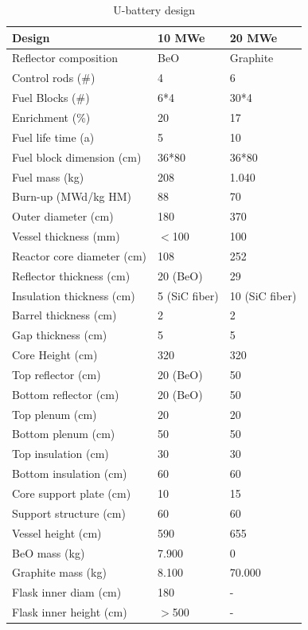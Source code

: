 \documentclass[10pt,a4paper]{article}
\begin{document}
\begin{table} [htbp]
\begin{center}

\caption{U-battery design}
\label{Utable}
\begin{tabular}{l l l}
\hline 
Design 		&10 MWe &20 MWe\\ 
\hline 
Reflector composition & BeO          &  Graphite\\
Control rods (\#) & 4                        &  6 \\
Fuel Blocks (\#) & 6*4                     & 30*4 \\
Enrichment (\%) & 20                      & 17  \\
Fuel life time (a)&  5                       & 10  \\
Fuel block dimension (cm) & 36*80 &  36*80 \\
Fuel mass (kg) & 208                     &   1.040\\
Burn-up (MWd/kg HM)  & 88           &   70 \\
\hline 
Outer diameter (cm)             &   180  &  370   \\
Vessel thickness (mm)        &   $<$100       & 100   \\
Reactor core diameter (cm)  &   108     &  252  \\
Reflector thickness (cm)      &   20 (BeO)    &29    \\
Insulation thickness (cm)     &   5 (SiC fiber)     & 10 (SiC fiber)   \\
Barrel thickness (cm)           &    2   & 2    \\
Gap thickness (cm)             &    5  &  5  \\
\hline 
Core Height (cm)          & 320         & 320 \\
Top reflector (cm)         &  20 (BeO)&50  \\
Bottom reflector (cm)    &  20 (BeO)& 50 \\
Top plenum (cm)          &20            &20  \\
Bottom plenum (cm)     &  50          &50  \\
Top insulation (cm)       &30           &30 \\
Bottom insulation (cm)  &  60         &60 \\
Core support plate (cm) &  10         &15  \\
Support structure (cm)  &   60         &60  \\
Vessel height (cm)       & 590         &655  \\
\hline 
BeO mass (kg) &    7.900       &0  \\
Graphite mass (kg) &   8.100        & 70.000  \\
Flask inner diam (cm)& 180       & - \\
Flask inner height (cm)& $>$500         & - \\
\hline 

\end{tabular}
\end{center}
\end{table}
\end{document}
